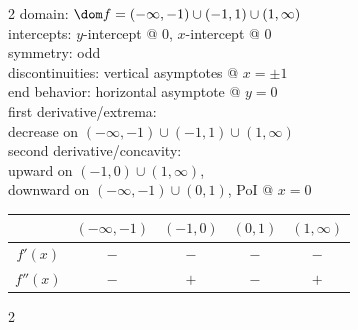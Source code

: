 \documentclass{book}
\begin{document}
\begin{appendices}
\begin{enumerate}[!HW!]
\begin{multicols}{2}
domain: $\dom f = (-\infty,-1)\cup(-1,1)\cup(1,\infty)$\\
intercepts: $y$-intercept @ 0, $x$-intercept @ 0\\
symmetry: odd \\ 
discontinuities: vertical asymptotes @ $x=\pm 1$\\
end behavior: horizontal asymptote @ $y=0$\\ 
first derivative/extrema:\\ decrease on $(-\infty, -1)\cup(-1,1)\cup(1,\infty)$ \\
second derivative/concavity:\\ upward on $(-1, 0)\cup (1,\infty)$,\\ downward on $(-\infty, -1)\cup (0,1)$, PoI @ $x=0$ \vspace{-15pt}
\begin{center}
\begin{tabular}{c|c|c|c|c}
 & $(-\infty, -1)$ & $(-1, 0)$ & $(0, 1)$ & $(1,\infty)$ \\ \hline
$f'(x)$ & $-$ & $-$ & $-$ & $-$ \\ 
$f''(x)$ & $-$ & $+$ & $-$ & $+$\\ 
\end{tabular}
\end{center} 
\end{multicols}

\itemspade \mbox{}\vspace{-25pt}

\begin{multicols}{2}
\columnbreak


\end{multicols}
\end{enumerate}
\end{appendices}
\end{document}
